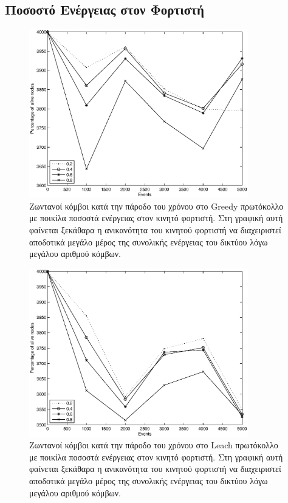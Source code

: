 \subsection{Ποσοστό Ενέργειας στον Φορτιστή}\label{subc:result5_3}
\begin{figure}[H]
  \centering
  \includegraphics[width=0.85\textwidth]{experiments/4000nodes/3.smallVSbigpercentage/alive_nodes_greedy_rc_per_our.eps}
  \caption{Ζωντανοί κόμβοι κατά την πάροδο του χρόνου στο Greedy πρωτόκολλο με ποικίλα ποσοστά ενέργειας στον κινητό φορτιστή. Στη γραφική αυτή φαίνεται ξεκάθαρα η
ανικανότητα του κινητού φορτιστή να διαχειριστεί αποδοτικά μεγάλο μέρος της συνολικής ενέργειας του δικτύου λόγω μεγάλου αριθμού κόμβων.}
  \label{fig:5_3exp_1_1}
\end{figure}

\begin{figure}[H]
  \centering
   \includegraphics[width=0.85\textwidth]{experiments/4000nodes/3.smallVSbigpercentage/alive_nodes_leach_rc_per_our.eps}
  \caption{Ζωντανοί κόμβοι κατά την πάροδο του χρόνου στο Leach πρωτόκολλο με ποικίλα ποσοστά ενέργειας στον κινητό φορτιστή. Στη γραφική αυτή φαίνεται ξεκάθαρα η
ανικανότητα του κινητού φορτιστή να διαχειριστεί αποδοτικά μεγάλο μέρος της συνολικής ενέργειας του δικτύου λόγω μεγάλου αριθμού κόμβων.}
  \label{fig:5_3exp_1_2}
\end{figure}


